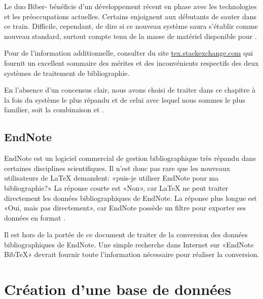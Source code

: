 Le duo Biber- bénéficie d'un développement récent en
phase avec les technologies et les préoccupations actuelles. Certains
enjoignent aux débutants de sauter dans ce train. Difficile,
cependant, de dire si ce nouveau système saura s'établir comme nouveau
standard, surtout compte tenu de la masse de matériel disponible pour
{\BibTeX}.

Pour de l'information additionnelle, consulter
du site \url{tex.stackexchange.com} qui fournit un excellent sommaire des
mérites et des inconvénients respectifs des deux systèmes de
traitement de bibliographie.

En l'absence d'un concensus clair, nous avons choisi de traiter dans
ce chapitre à la fois du système le plus répandu et de celui avec
lequel nous sommes le plus familier, soit la combinaison {\BibTeX} et
.

\subsection{EndNote}
\label{sec:bibliographie:systeme:endnote}

EndNote est un logiciel commercial de gestion bibliographique très
répandu dans certaines disciplines scientifiques. Il n'est donc pas
rare que les nouveaux utilisateurs de {\LaTeX} demandent: «puis-je
utiliser EndNote pour ma bibliographie?» La réponse courte est «Non»,
car {\LaTeX} ne peut traiter directement les données bibliographiques
de EndNote. La réponse plus longue est «Oui, mais pas directement»,
car EndNote possède un filtre pour exporter ses données en format
{\BibTeX}.

Il est hors de la portée de ce document de traiter de la conversion
des données bibliographiques de EndNote. Une simple recherche dans
Internet sur «EndNote BibTeX» devrait fournir toute l'information
nécessaire pour réaliser la conversion.



\section{Création d'une base de données}
\label{sec:bibliographie:bib}


